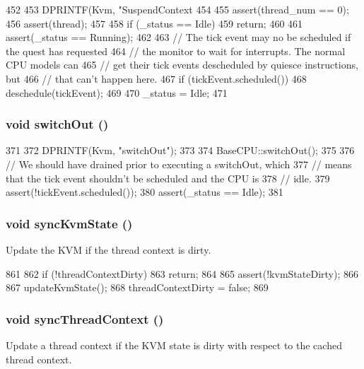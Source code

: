 \begin{DoxyCode}
452 {
453     DPRINTF(Kvm, "SuspendContext %
454 
455     assert(thread_num == 0);
456     assert(thread);
457 
458     if (_status == Idle)
459         return;
460 
461     assert(_status == Running);
462 
463     // The tick event may no be scheduled if the quest has requested
464     // the monitor to wait for interrupts. The normal CPU models can
465     // get their tick events descheduled by quiesce instructions, but
466     // that can't happen here.
467     if (tickEvent.scheduled())
468         deschedule(tickEvent);
469 
470     _status = Idle;
471 }
\end{DoxyCode}
\hypertarget{classBaseKvmCPU_a05f299b443f8cc73a93d61572edc0218}{
\subsubsection[{switchOut}]{\setlength{\rightskip}{0pt plus 5cm}void switchOut ()}}
\label{classBaseKvmCPU_a05f299b443f8cc73a93d61572edc0218}



\begin{DoxyCode}
371 {
372     DPRINTF(Kvm, "switchOut\n");
373 
374     BaseCPU::switchOut();
375 
376     // We should have drained prior to executing a switchOut, which
377     // means that the tick event shouldn't be scheduled and the CPU is
378     // idle.
379     assert(!tickEvent.scheduled());
380     assert(_status == Idle);
381 }
\end{DoxyCode}
\hypertarget{classBaseKvmCPU_a8633407bfc3732fef1f78ef60345873d}{
\subsubsection[{syncKvmState}]{\setlength{\rightskip}{0pt plus 5cm}void syncKvmState ()}}
\label{classBaseKvmCPU_a8633407bfc3732fef1f78ef60345873d}
Update the KVM if the thread context is dirty. 


\begin{DoxyCode}
861 {
862     if (!threadContextDirty)
863         return;
864 
865     assert(!kvmStateDirty);
866 
867     updateKvmState();
868     threadContextDirty = false;
869 }
\end{DoxyCode}
\hypertarget{classBaseKvmCPU_a5d4ee3823af24f9210efb370a4c8ce93}{
\subsubsection[{syncThreadContext}]{\setlength{\rightskip}{0pt plus 5cm}void syncThreadContext ()}}
\label{classBaseKvmCPU_a5d4ee3823af24f9210efb370a4c8ce93}
Update a thread context if the KVM state is dirty with respect to the cached thread context. 


